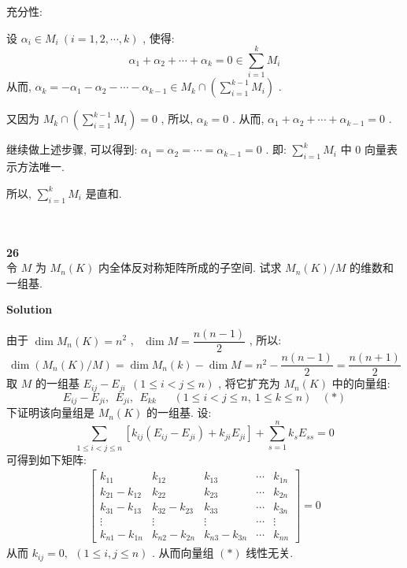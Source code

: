 \documentclass[11pt,a4paper,openany,oneside]{book}
\newcommand\Solution{\noindent\textbf{\textsf{Solution}}\par\medskip}
\begin{document}
充分性:

设 $ \alpha_i \in M_i \ (i = 1, 2, \cdots, k) $ , 使得:
 $$  \alpha_1 + \alpha_2 + \cdots + \alpha_k = 0 \in \sum\limits_{i=1}^k M_i  $$ 
\hspace{2.5em} 从而,  $ \alpha_k = -\alpha_1 - \alpha_2 - \cdots - \alpha_{k-1} \in M_k \cap \left(\sum\limits_{i=1}^{k-1}M_i \right) $ . 

又因为  $ M_k \cap \left(\sum\limits_{i=1}^{k-1}M_i \right) = {0} $ , 所以,  $ \alpha_k = 0 $ . 从而,  $ \alpha_1 + \alpha_2 + \cdots + \alpha_{k-1} = 0 $ . 

继续做上述步骤, 可以得到:  $ \alpha_1 = \alpha_2 = \cdots = \alpha_{k-1} = 0 $ . 即: $ \sum\limits_{i=1}^k M_i $ 中 $ 0 $ 向量表示方法唯一.

所以,  $ \sum\limits_{i=1}^k M_i $ 是直和.  \\  \\  \\



\begin{myexample}
	\textbf{26}  \\
令 $ M $ 为 $ M_n(K) $ 内全体反对称矩阵所成的子空间. 试求 $ M_n(K)/M $ 的维数和一组基. \\ 

\end{myexample}
\Solution 

由于 $ \dim  M_n(K) = n^2 $ , \  $ \dim  M = \dfrac{n(n-1)}{2} $ , 所以:
 $$  \dim \left(M_n(K)/M \right) = \dim M_n(k) - \dim  M = n^2 - \dfrac{n(n-1)}{2} = \dfrac{n(n+1)}{2}  $$ 
取 $ M $ 的一组基 $ E_{ij} - E_{ji} \ \ (1 \leq i < j \leq n) $ , 将它扩充为 $ M_n(K) $ 中的向量组:
 $$  E_{ij} - E_{ji},\ \ E_{ji}, \ \  E_{kk} \ \ \ \ \ \ \  (1 \leq i < j \leq n, \ 1 \leq k \leq n) \ \ \ \ (*) $$ 
下证明该向量组是 $ M_n(K) $ 的一组基. 设:
 $$  \sum\limits_{1 \leq i < j \leq n} \left[ k_{ij}(E_{ij} - E_{ji})+k_{ji}E_{ji} \right] + \sum\limits_{s=1}^n k_sE_{ss} = 0  $$ 
\hspace{1.7em} 可得到如下矩阵:
\begin{gather*}
\begin{bmatrix}
k_{11}         &  k_{12}  &  k_{13} &  \cdots  &  k_{1n} \\
k_{21}-k_{12}  &  k_{22}  &  k_{23} &  \cdots  &  k_{2n}  \\
k_{31}-k_{13}  &  k_{32} - k_{23} & k_{33} & \cdots & k_{3n} \\
\vdots         &  \vdots          & \vdots & \cdots  & \vdots \\
k_{n1}-k_{1n}  & k_{n2}-k_{2n} &  k_{n3} -k_{3n}  & \cdots & k_{nn} 
\end{bmatrix} = 0
\end{gather*}
从而 $ k_{ij} = 0,\ \ (1 \leq i, j \leq n ) $ . 从而向量组 $ (*) $ 线性无关. 
\end{document}
